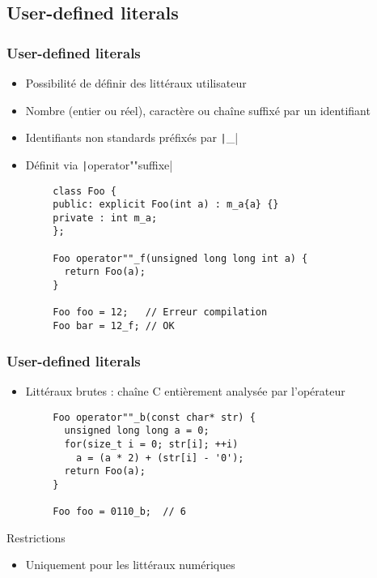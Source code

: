 \documentclass[C++.tex]{subfiles}
\begin{document}
\subsection*{User-defined literals}
\begin{frame}[fragile]
	\frametitle{User-defined literals}
	\begin{itemize}
		\item Possibilité de définir des littéraux \og utilisateur\fg{}
		\item Nombre (entier ou réel), caractère ou chaîne suffixé par un identifiant
		\item Identifiants non standards préfixés par \texttt|_|


		\item Définit via \texttt|operator""suffixe|
	\end{itemize}

	\begin{verbatim}
		class Foo {
		public: explicit Foo(int a) : m_a{a} {}
		private : int m_a;
		};

		Foo operator""_f(unsigned long long int a) {
		  return Foo(a);
		}

		Foo foo = 12;   // Erreur compilation
		Foo bar = 12_f; // OK
	\end{verbatim}


\end{frame}

\begin{frame}[fragile]
	\frametitle{User-defined literals}
	\begin{itemize}
		\item Littéraux brutes : chaîne C entièrement analysée par l'opérateur
	\end{itemize}
	
	\begin{verbatim}
		Foo operator""_b(const char* str) {
		  unsigned long long a = 0;
		  for(size_t i = 0; str[i]; ++i)
		    a = (a * 2) + (str[i] - '0');
		  return Foo(a);
		}

		Foo foo = 0110_b;  // 6
	\end{verbatim}

	\begin{alertblock}{Restrictions}
		\begin{itemize}
			\item Uniquement pour les littéraux numériques
		\end{itemize}
	\end{alertblock}
\end{frame}
\end{document}
